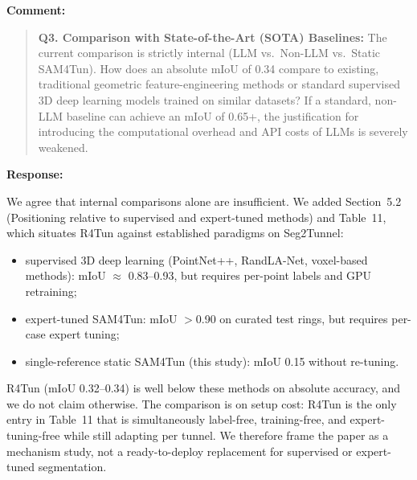\documentclass[11pt,a4paper]{article}
\newenvironment{commentblock}{%
  \par\smallskip\noindent\textbf{Comment:}\par
  \begin{quote}\itshape\color{black}
}{%
  \end{quote}\smallskip
}
\newenvironment{responseblock}{%
  \par\smallskip\noindent\textbf{Response:}\par
  \begingroup\color{responsegreen}
}{%
  \endgroup\smallskip
}
\begin{document}
\begin{commentblock}
\textbf{Q3. Comparison with State-of-the-Art (SOTA) Baselines:} The current comparison is strictly internal (LLM vs.\ Non-LLM vs.\ Static SAM4Tun). How does an absolute mIoU of 0.34 compare to existing, traditional geometric feature-engineering methods or standard supervised 3D deep learning models trained on similar datasets? If a standard, non-LLM baseline can achieve an mIoU of 0.65+, the justification for introducing the computational overhead and API costs of LLMs is severely weakened.
\end{commentblock}
\begin{responseblock}
We agree that internal comparisons alone are insufficient. We added Section~5.2 (Positioning relative to supervised and expert-tuned methods) and Table~11, which situates R4Tun against established paradigms on Seg2Tunnel:
\begin{itemize}[nosep]
  \item supervised 3D deep learning (PointNet++, RandLA-Net, voxel-based methods): mIoU $\approx$ 0.83--0.93, but requires per-point labels and GPU retraining;
  \item expert-tuned SAM4Tun: mIoU $>$0.90 on curated test rings, but requires per-case expert tuning;
  \item single-reference static SAM4Tun (this study): mIoU 0.15 without re-tuning.
\end{itemize}
R4Tun (mIoU 0.32--0.34) is well below these methods on absolute accuracy, and we do not claim otherwise. The comparison is on setup cost: R4Tun is the only entry in Table~11 that is simultaneously label-free, training-free, and expert-tuning-free while still adapting per tunnel. We therefore frame the paper as a mechanism study, not a ready-to-deploy replacement for supervised or expert-tuned segmentation.
\end{responseblock}
\end{document}
